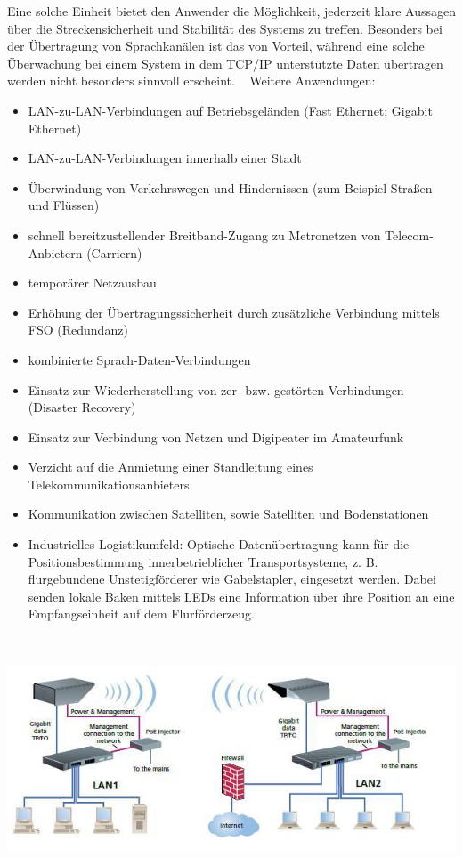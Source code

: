 \begin{multicols}{3}
Eine solche Einheit bietet den Anwender die Möglichkeit, jederzeit klare Aussagen über die Streckensicherheit und Stabilität des Systems zu treffen. Besonders bei der Übertragung von Sprachkanälen ist das von Vorteil, während eine solche Überwachung bei einem System in dem TCP/IP unterstützte Daten übertragen werden nicht besonders sinnvoll erscheint. ~\cite{Laserlink.3}
Weitere Anwendungen:
\begin{itemize}
      \item LAN-zu-LAN-Verbindungen auf Betriebsgeländen (Fast Ethernet; Gigabit Ethernet)
      \item LAN-zu-LAN-Verbindungen innerhalb einer Stadt
      \item Überwindung von Verkehrswegen und Hindernissen (zum Beispiel Straßen und Flüssen)
      \item schnell bereitzustellender Breitband-Zugang zu Metronetzen von Telecom-Anbietern (Carriern)
      \item temporärer Netzausbau
      \item Erhöhung der Übertragungssicherheit durch zusätzliche Verbindung mittels FSO (Redundanz)
      \item kombinierte Sprach-Daten-Verbindungen
      \item Einsatz zur Wiederherstellung von zer- bzw. gestörten Verbindungen (Disaster Recovery)
      \item Einsatz zur Verbindung von Netzen und Digipeater im Amateurfunk
      \item Verzicht auf die Anmietung einer Standleitung eines Telekommunikationsanbieters
      \item Kommunikation zwischen Satelliten, sowie Satelliten und Bodenstationen
      \item Industrielles Logistikumfeld: Optische Datenübertragung kann für die Positionsbestimmung innerbetrieblicher Transportsysteme, z. B. flurgebundene Unstetigförderer wie Gabelstapler, eingesetzt werden. Dabei senden lokale Baken mittels LEDs eine Information über ihre Position an eine Empfangseinheit auf dem Flurförderzeug.
\end{itemize} ~\cite{Laserlink.4}
\begin{Figure}
\includegraphics[width=\linewidth]{Kapitel/Laserlink/Grafiken/Laserlink} 
\end{Figure}


\end{multicols}
